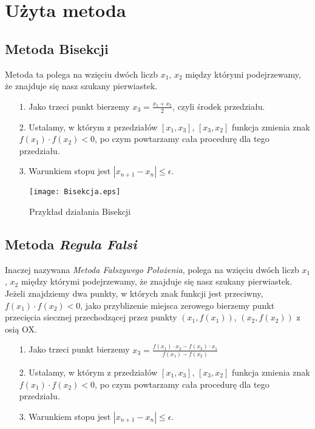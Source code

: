 \documentclass{article}
\begin{document}
  \section{Użyta metoda}
  \subsection{Metoda Bisekcji}
    Metoda ta polega na wzięciu dwóch liczb $x_1$, $x_2$ między którymi podejrzewamy, że znajduje się nasz szukany pierwiastek.

    \begin{enumerate}
      \item[1.] Jako trzeci punkt bierzemy $x_3 = \frac{x_1+x_2}{2} $, czyli środek przedziału.
      \item[2.]Ustalamy, w którym z przedziałów $[x_1, x_3]$, $[x_3, x_2]$ funkcja zmienia znak  $f(x_1) \cdot f(x_2) < 0$, po czym powtarzamy cała procedurę dla tego przedziału.
      \item[3.]Warunkiem stopu jest $|x_{n+1} - x_{n}| \leq \epsilon $.
    \end{enumerate}

    \begin{figure}[!ht]
      \begin{center}
          \texttt{[image: Bisekcja.eps]}
          \caption{Przykład działania Bisekcji}
      \end{center}
  \end{figure}

  \newpage

  \subsection{Metoda \textit{Regula Falsi}}
  Inaczej nazywana \textit{Metoda Fałszywego Położenia}, polega na wzięciu dwóch liczb $x_1$, $x_2$ między którymi podejrzewamy, że znajduje się nasz szukany pierwiastek. Jeżeli znajdziemy dwa punkty, w których znak funkcji jest przeciwny, $f(x_1) \cdot f(x_2) < 0$, jako przyblizenie miejsca zerowego bierzemy punkt przecięcia siecznej przechodzącej przez punkty $(x_1, f(x_1))$, $(x_2, f(x_2))$ z osią OX.

  \begin{enumerate}
    \item[1.] Jako trzeci punkt bierzemy $x_3 = \frac{f(x_1)\cdot x_2-f(x_2)\cdot x_1}{f(x_1)-f(x_2)} $
    \item[2.]Ustalamy, w którym z przedziałów $[x_1, x_3]$, $[x_3, x_2]$ funkcja zmienia znak  $f(x_1) \cdot f(x_2) < 0$, po czym powtarzamy cała procedurę dla tego przedziału.
    \item[3.]Warunkiem stopu jest $|x_{n+1} - x_{n}| \leq \epsilon $.
  \end{enumerate}
\end{document}
